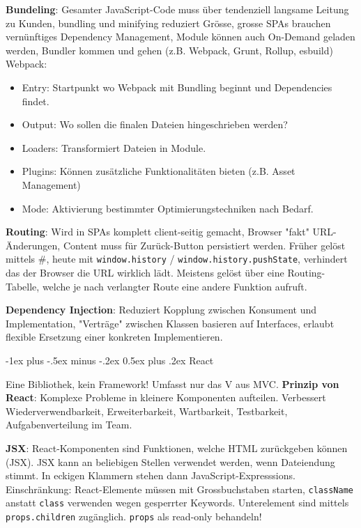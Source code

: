 \documentclass[10pt,landscape]{article}
\makeatletter
\renewcommand{\section}{\@startsection{section}{1}{0mm}%
{-1ex plus -.5ex minus -.2ex}%
{0.5ex plus .2ex}%
{\normalfont\large\bfseries}}
\makeatother
\begin{document}
\begin{multicols}{2}
        \textbf{Bundeling}: Gesamter JavaScript-Code muss über tendenziell langsame Leitung zu Kunden, bundling und minifying reduziert Grösse, grosse SPAs brauchen vernünftiges Dependency Management, Module können auch On-Demand geladen werden, Bundler kommen und gehen (z.B. Webpack, Grunt, Rollup, esbuild)
        Webpack:

        \begin{itemize}
            \item Entry: Startpunkt wo Webpack mit Bundling beginnt und Dependencies findet.
            \item Output: Wo sollen die finalen Dateien hingeschrieben werden?
            \item Loaders: Transformiert Dateien in Module.
            \item Plugins: Können zusätzliche Funktionalitäten bieten (z.B. Asset Management)
            \item Mode: Aktivierung bestimmter Optimierungstechniken nach Bedarf.
        \end{itemize}

        \textbf{Routing}: Wird in SPAs komplett client-seitig gemacht, Browser "fakt" URL-Änderungen, Content muss für Zurück-Button persistiert werden.
        Früher gelöst mittels \#, heute mit \lstinline{window.history} / \lstinline{window.history.pushState}, verhindert das der Browser die URL wirklich lädt.
        Meistens gelöst über eine Routing-Tabelle, welche je nach verlangter Route eine andere Funktion aufruft.

        \textbf{Dependency Injection}: Reduziert Kopplung zwischen Konsument und Implementation, "Verträge" zwischen Klassen basieren auf Interfaces, erlaubt flexible Ersetzung einer konkreten Implementieren.


        \section{React}

        Eine Bibliothek, kein Framework!
        Umfasst nur das V aus MVC.
        \textbf{Prinzip von React}: Komplexe Probleme in kleinere Komponenten aufteilen.
        Verbessert Wiederverwendbarkeit, Erweiterbarkeit, Wartbarkeit, Testbarkeit, Aufgabenverteilung im Team.

        \textbf{JSX}: React-Komponenten sind Funktionen, welche HTML zurückgeben können (JSX).
        JSX kann an beliebigen Stellen verwendet werden, wenn Dateiendung stimmt.
        In eckigen Klammern stehen dann JavaScript-Expresssions.
        Einschränkung: React-Elemente müssen mit Grossbuchstaben starten, \lstinline{className} anstatt \lstinline{class} verwenden wegen gesperrter Keywords.
        Unterelement sind mittels \lstinline{props.children} zugänglich.
        \lstinline{props} als read-only behandeln!


\end{multicols}
\end{document}
